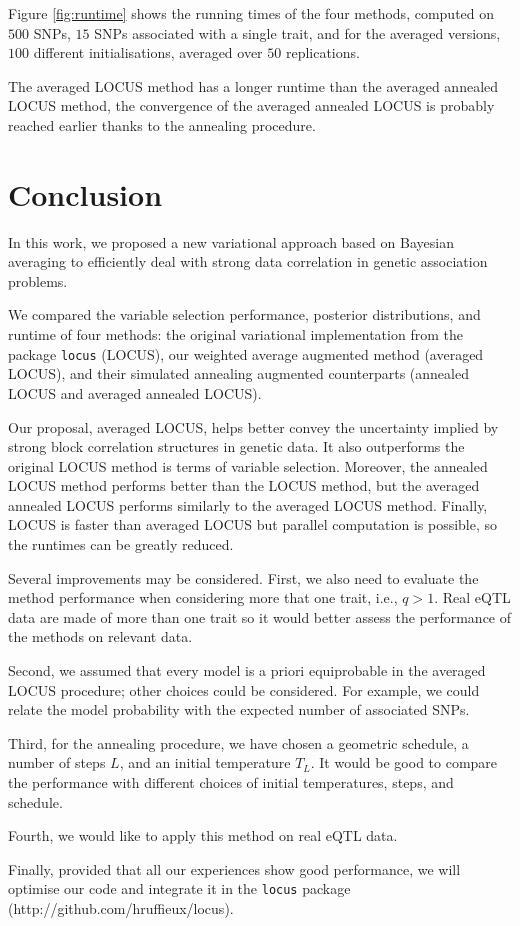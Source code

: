 \documentclass[a4paper, 11pt]{report}
\numberwithin{equation}{chapter}
\begin{document}
Figure \ref{fig:runtime} shows the running times of the four methods, computed on $500$ SNPs, $15$ SNPs associated with a single trait, and for the averaged versions, $100$ different initialisations, averaged over $50$ replications. 

The averaged LOCUS method has a longer runtime than the averaged annealed LOCUS method, the convergence of the averaged annealed LOCUS is probably reached earlier thanks to the annealing procedure.
%
%
%
%
%
%
\newpage
\chapter{Conclusion}
In this work, we proposed a new variational approach based on Bayesian averaging to efficiently deal with strong data correlation in genetic association problems.

We compared the variable selection performance, posterior distributions, and runtime of four methods: the original variational implementation from the package \texttt{locus} (LOCUS), our weighted average augmented method (averaged LOCUS), and their simulated annealing augmented counterparts (annealed LOCUS and averaged annealed LOCUS). 

Our proposal, averaged LOCUS, helps better convey the uncertainty implied by strong block correlation structures in genetic data. It also outperforms the original LOCUS method is terms of variable selection. Moreover, the annealed LOCUS method performs better than the LOCUS method, but the averaged annealed LOCUS performs similarly to the averaged LOCUS method. Finally, LOCUS is faster than averaged LOCUS but parallel computation is possible, so the runtimes can be greatly reduced.

Several improvements may be considered. First, we also need to evaluate the method performance when considering more that one trait, i.e., $q > 1$. Real eQTL data are made of more than one trait so it would better assess the performance of the methods on relevant data.

Second, we assumed that every model is a priori equiprobable in the averaged LOCUS procedure; other choices could be considered. For example, we could relate the model probability with the expected number of associated SNPs.

Third, for the annealing procedure, we have chosen a geometric schedule, a number of steps $L$, and an initial temperature $T_L$. It would be good to compare the performance with different choices of initial temperatures, steps, and schedule.


Fourth, we would like to apply this method on real eQTL data.

Finally, provided that all our experiences show good performance, we will optimise our code and integrate it in the \texttt{locus} package\\
 (http://github.com/hruffieux/locus).
\newpage


\end{document}
